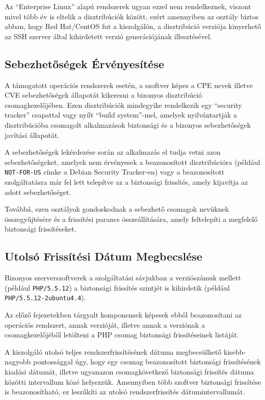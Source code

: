 	Az ``Enterprise Linux'' alapú rendszerek ugyan ezzel nem rendelkeznek, viszont mivel több év is eltelik a disztribúciók között, ezért amennyiben az osztály biztos abban, hogy Red Hat/CentOS fut a kiszolgálón, a disztribúció verziója kinyerhető az SSH szerver által kihirdetett verzió generációjának illesztésével.

\subsection*{Sebezhetőségek Érvényesítése}

	A támogatott operációs rendszerek esetén, a szoftver képes a CPE nevek illetve CVE sebezhetőségek állapotát kikeresni a bizonyos disztribúció csomagkezelőjében. Ezen disztribúciók mindegyike rendelkezik egy ``security tracker'' csapattal vagy nyílt ``build system''-mel, amelyek nyilvántartják a disztribúcióba csomagolt alkalmazások biztonsági és a bizonyos sebezhetőségek javítási állapotát.
	
	A sebezhetőségek lekérdezése során az alkalmazás el tudja vetni azon sebezhetőségeket, amelyek nem érvényesek a beazonosított disztribúcióra (például \texttt{NOT-FOR-US} címke a Debian Security Tracker-en) vagy a beazonosított szolgáltatásra már fel lett telepítve az a biztonsági frissítés, amely kijavítja az adott sebezhetőséget.
	
	Továbbá, ezen osztályok gondoskodnak a sebezhető csomagok nevüknek összegyűjtésére és a frissítési parancs összeállítására, amely feltelepíti a megfelelő biztonsági frissítéseket.

\subsection*{Utolsó Frissítési Dátum Megbecslése}

	Bizonyos szerverszoftverek a szolgáltatási sávjukban a verziószámuk mellett (például \texttt{PHP/5.5.12}) a biztonsági frissítés szintjét is kihirdetik (például \texttt{PHP/5.5.12-2ubuntu4.4}).
	
	Az előző fejezetekben tárgyalt komponensek képesek ebből beazonosítani az operációs rendszert, annak verzióját, illetve annak a verziónak a csomagkezelőjéből letölteni a PHP csomag biztonsági frissítéseinek listáját.
	
	A kiszolgáló utolsó teljes rendszerfrissítésének dátuma megbecsülhető kisebb-nagyobb pontossággal úgy, hogy egy csomag beazonosított biztonsági frissítésének kiadási dátumát, illetve ugyanazon csomagkövetkező biztonsági frissítés dátuma közötti intervallum közé helyezzük. Amennyiben több szoftver biztonsági frissítése is beazonosítható, ez leszűkíti az utolsó rendszerfrissítés dátumintervallumát.
	
